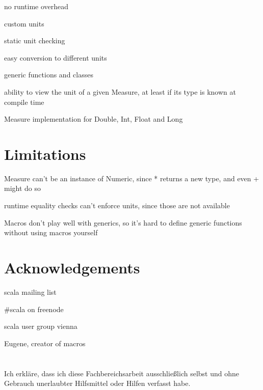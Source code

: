 \documentclass[12pt,oneside,a4paper]{scrbook}
\theoremstyle{definition}
\begin{document}
no runtime overhead

custom units

static unit checking

easy conversion to different units

generic functions and classes

ability to view the unit of a given Measure, at least if its type is known at compile time

Measure implementation for Double, Int, Float and Long

\chapter{Limitations}

Measure can't be an instance of Numeric, since * returns a new type, and even + might do so

runtime equality checks can't enforce units, since those are not available

Macros don't play well with generics, so it's hard to define generic functions without using macros yourself

\chapter{Acknowledgements}
scala mailing list

#scala on freenode

scala user group vienna

Eugene, creator of macros


\singlespacing

{}

\chapter*{}
\onehalfspacing
Ich erkläre, dass ich diese Fachbereichsarbeit ausschließlich selbst und ohne Gebrauch unerlaubter Hilfsmittel oder Hilfen verfasst habe.
\end{document}
